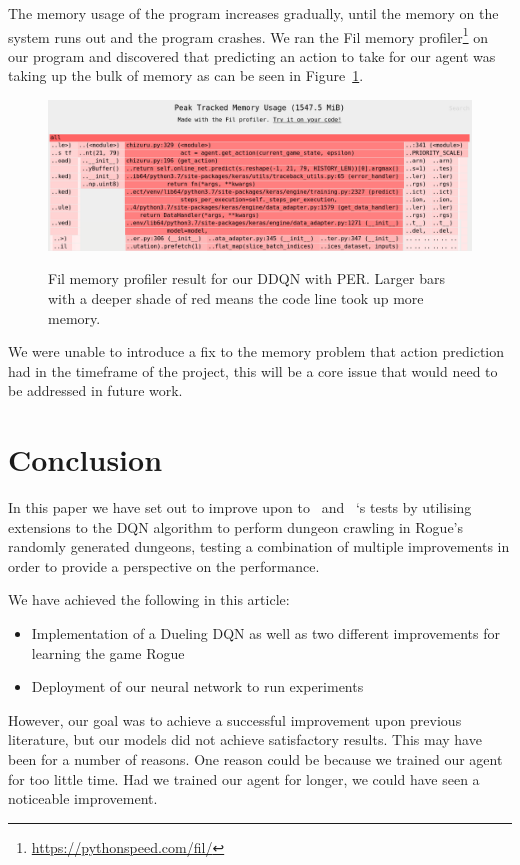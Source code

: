 \documentclass[12pt,a4paper]{article}
\begin{document}
    The memory usage of the program increases gradually, until the memory on the system runs out and the program crashes.
    We ran the Fil memory profiler\footnote{\url{https://pythonspeed.com/fil/}} on our program and discovered that predicting an action to take for our agent was taking up the bulk of memory as can be seen in Figure~\ref{fig:fil}.

    \begin{figure}[h]
        \caption[Fil Profiler result for DDQN with PER.]{Fil memory profiler result for our DDQN with PER. Larger bars with a deeper shade of red means the code line took up more memory.}
        \centering
        \includegraphics[scale=0.3]{fil}
        \label{fig:fil}
    \end{figure}

    We were unable to introduce a fix to the memory problem that action prediction had in the timeframe of the project,
    this will be a core issue that would need to be addressed in future work.

    \section{Conclusion}\label{sec:conclusion}
    In this paper we have set out to improve upon to~\citet{asperti18} and ~\citet{kanagawa19}`s tests by utilising extensions to the DQN algorithm
    to perform dungeon crawling in Rogue's randomly generated dungeons, testing a combination of multiple improvements in order to
    provide a perspective on the performance.

    We have achieved the following in this article:
    \begin{itemize}
        \item Implementation of a Dueling DQN as well as two different improvements for learning the game Rogue
        \item Deployment of our neural network to run experiments
    \end{itemize}

    However, our goal was to achieve a successful improvement upon previous literature, but our models did not achieve satisfactory results.
    This may have been for a number of reasons.
    One reason could be because we trained our agent for too little time.
    Had we trained our agent for longer, we could have seen a noticeable improvement.
\end{document}

